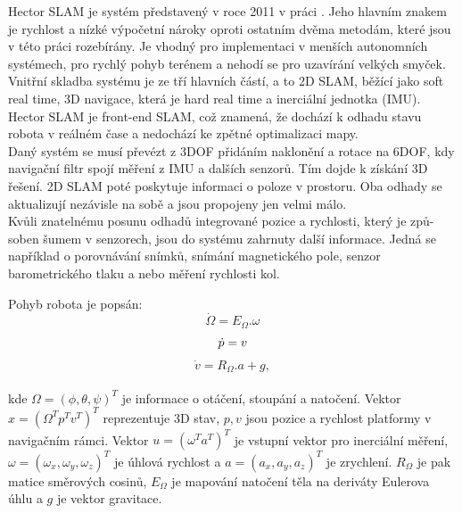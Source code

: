 \documentclass[12pt]{report}
\begin{document}
Hector SLAM je systém představený v roce 2011 v práci \cite{Kohlbrecher2011}. Jeho hlavním znakem je rychlost a nízké výpočetní nároky oproti ostatním dvěma metodám, které jsou v této práci rozebírány. Je vhodný pro implementaci v menších autonomních systémech, pro rychlý pohyb terénem a nehodí se pro uzavírání velkých smyček.\\
\indent Vnitřní skladba systému je ze tří hlavních částí, a to 2D SLAM, běžící jako soft real time, 3D navigace, která je hard real time a inerciální jednotka (IMU). Hector SLAM je front-end SLAM, což znamená, že dochází k odhadu stavu robota v reálném čase a nedochází ke zpětné optimalizaci mapy.\\
\indent Daný systém se musí převézt z 3DOF přidáním naklonění a rotace na 6DOF, kdy navigační filtr spojí měření z IMU a dalších senzorů. Tím dojde k získání 3D řešení. 2D SLAM poté poskytuje informaci o poloze v prostoru. Oba odhady se aktualizují nezávisle na sobě a jsou propojeny jen velmi málo.\\
\indent Kvůli znatelnému posunu odhadů integrované pozice a rychlosti, který je způ-\\soben šumem v senzorech, jsou do systému zahrnuty další informace. Jedná se například o porovnávání snímků, snímání magnetického pole, senzor barometrického tlaku a nebo měření rychlosti kol.

Pohyb robota je popsán:
\begin{equation}
	\dot{\Omega}=E_\Omega.\omega
\end{equation}
\begin{equation}
	\dot{p}=v\\
\end{equation}
\begin{equation}
	\dot{v}=R_\Omega.a+g,
\end{equation}\\
kde $\Omega=(\phi,\theta,\psi)^T$ je informace o otáčení, stoupání a natočení. Vektor $x=(\Omega^T p^T v^T)^T$ reprezentuje 3D stav, $p,v$ jsou pozice a rychlost platformy v navigačním rámci. Vektor $u=(\omega^T a^T)^T$ je vstupní vektor pro inerciální měření, $\omega=(\omega_x,\omega_y,\omega_z)^T$ je úhlová rychlost a $a=(a_x,a_y,a_z)^T$ je zrychlení. $R_\Omega$ je pak matice směrových cosinů, $E_\Omega$ je mapování natočení těla na deriváty Eulerova úhlu a $g$ je vektor gravitace.\\
\end{document}
